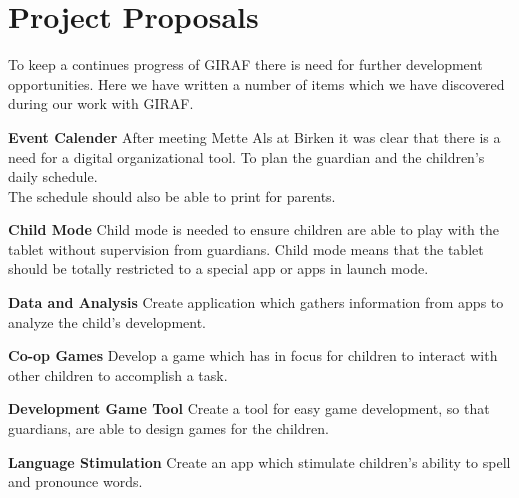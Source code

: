 \section{Project Proposals}
\label{chap:projectProposals}
To keep a continues progress of GIRAF there is need for further development opportunities. Here we have written a number of items which we have discovered during our work with GIRAF.

\textbf{Event Calender} 
After meeting Mette Als at Birken it was clear that there is a need for a digital organizational tool. To plan the guardian and the children's daily schedule.\\
The schedule should also be able to print for parents.     

\textbf{Child Mode}
Child mode is needed to ensure children are able to play with the tablet without supervision from guardians.
Child mode means that the tablet should be totally restricted to a special app or apps in launch mode.     

\textbf{Data and Analysis}
Create application which gathers information from apps to analyze the child’s development. 

\textbf{Co-op Games}
Develop a game which has in focus for children to interact with other children to accomplish a task.

\textbf{Development Game Tool}
Create a tool for easy game development, so that guardians, are able to design games for the children.

\textbf{Language Stimulation}
Create an app which stimulate children's ability to spell and pronounce words.       

